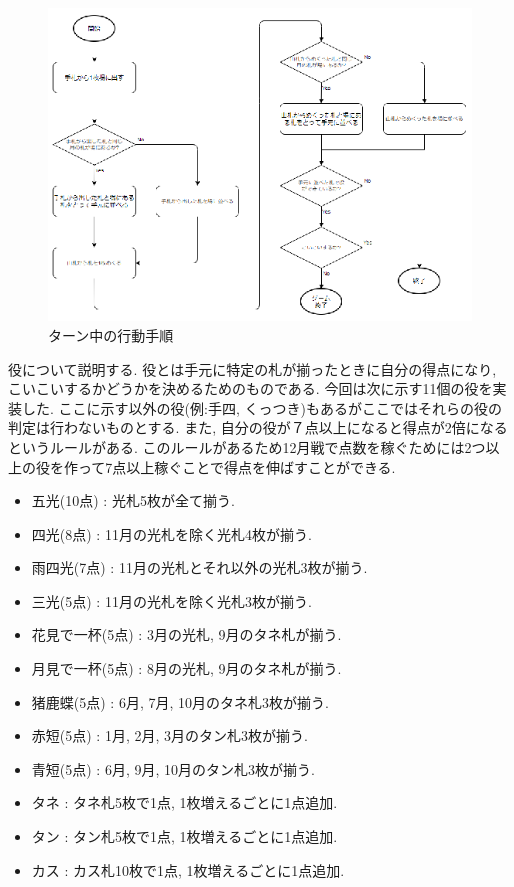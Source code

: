 \documentclass[a4j]{jarticle}
\begin{document}
      \begin{figure}[H]
      \centering
      \includegraphics[scale=1.8]{./img/turn-flow.eps}
      \caption{ターン中の行動手順}
      \label{turn-flow}
      \end{figure}

      役について説明する. 役とは手元に特定の札が揃ったときに自分の得点になり, こいこいするかどうかを決めるためのものである. 今回は次に示す11個の役を実装した. 
      ここに示す以外の役(例:手四, くっつき)もあるがここではそれらの役の判定は行わないものとする. また, 自分の役が７点以上になると得点が2倍になるというルールがある.
      このルールがあるため12月戦で点数を稼ぐためには2つ以上の役を作って7点以上稼ぐことで得点を伸ばすことができる.
      \begin{itemize}
        \item 五光(10点) : 光札5枚が全て揃う.
        \item 四光(8点) : 11月の光札を除く光札4枚が揃う.
        \item 雨四光(7点) : 11月の光札とそれ以外の光札3枚が揃う.
        \item 三光(5点) : 11月の光札を除く光札3枚が揃う.
        \item 花見で一杯(5点) : 3月の光札, 9月のタネ札が揃う.
        \item 月見で一杯(5点) : 8月の光札, 9月のタネ札が揃う.
        \item 猪鹿蝶(5点) : 6月, 7月, 10月のタネ札3枚が揃う.
        \item 赤短(5点) : 1月, 2月, 3月のタン札3枚が揃う.
        \item 青短(5点) : 6月, 9月, 10月のタン札3枚が揃う.
        \item タネ : タネ札5枚で1点, 1枚増えるごとに1点追加.
        \item タン : タン札5枚で1点, 1枚増えるごとに1点追加.
        \item カス : カス札10枚で1点, 1枚増えるごとに1点追加.
      \end{itemize}
      
\end{document}
